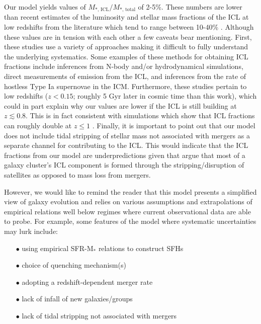 \documentclass[a4paper,fleqn,usenatbib]{mnras}
\begin{document}
Our model yields values of $M_{*,\,\mathrm{ICL}} / M_{*,\,\mathrm{total}}$ of 2-5\%.
These numbers are lower than recent estimates of the luminosity and stellar mass fractions of the ICL at low redshifts from the literature which tend to range between 10-40\% \citep[e.g.][]{Willman2004, Rudick2006, Gonzalez2007, Murante2007, Sand2011, Contini2014, Mihos2017}.
Although these values are in tension with each other a few caveats bear mentioning.
First, these studies use a variety of approaches making it difficult to fully understand the underlying systematics.
Some examples of these methods for obtaining ICL fractions include inferences from N-body and/or hydrodynamical simulations, direct measurements of emission from the ICL, and inferences from the rate of hostless Type Ia supernovae in the ICM.
Furthermore, these studies pertain to low redshifts ($z < 0.15$; roughly 5 Gyr later in cosmic time than this work), which could in part explain why our values are lower if the ICL is still building at $z \lesssim 0.8$.
This is in fact consistent with simulations which show that ICL fractions can roughly double at $z \leq 1$ \citep{Willman2004, Rudick2006}.
Finally, it is important to point out that our model does not include tidal stripping of stellar mass not associated with mergers as a separate channel for contributing to the ICL.
This would indicate that the ICL fractions from our model are underpredictions given that \citet{Contini2014} argue that most of a galaxy cluster's ICL component is formed through the stripping/disruption of satellites as opposed to mass loss from mergers.


However, we would like to remind the reader that this model presents a simplified view of galaxy evolution and relies on various assumptions and extrapolations of empirical relations well below regimes where current observational data are able to probe.
For example, some features of the model where systematic uncertainties may lurk include:

\begin{enumerate}
\item[$\bullet$] using empirical SFR-M$_*$ relations to construct SFHs \\[-4mm]
\item[$\bullet$] choice of quenching mechanism(s) \\[-4mm]
\item[$\bullet$] adopting a redshift-dependent merger rate \\[-4mm]
\item[$\bullet$] lack of infall of new galaxies/groups \\[-4mm]
\item[$\bullet$] lack of tidal stripping not associated with mergers
\end{enumerate}
\end{document}
